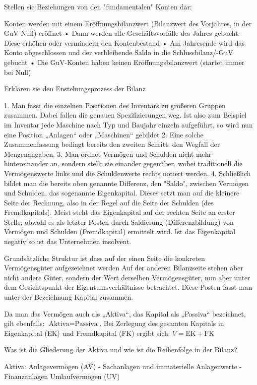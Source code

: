 Stellen sie Beziehungen von den "fundamentalen" Konten dar:

Konten werden mit einem
Eröffnungsbilanzwert
(Bilanzwert des Vorjahres, in der GuV
Null) eröffnet
• Dann werden alle Geschäftsvorfälle des
Jahres gebucht. Diese erhöhen oder
vermindern den Kontenbestand
• Am Jahresende wird das Konto
abgeschlossen und der verbleibende
Saldo in die Schlussbilanz/-GuV
gebucht
• Die GuV-Konten haben keinen
Eröffnungsbilanzwert
(startet immer bei Null)


Erklären sie den Enstehungsprozess der Bilanz

1. Man fasst die einzelnen Positionen des Inventars zu größeren Gruppen zusammen.
   Dabei fallen die genauen Spezifizierungen weg. Ist also zum Beispiel im Inventar
   jede Maschine nach Typ und Baujahr einzeln aufgeführt, so wird nun eine Position
   „Anlagen“ oder „Maschinen“ gebildet
2. Eine solche Zusammenfassung bedingt bereits den zweiten Schritt: den Wegfall der Mengenangaben.
3. Man ordnet Vermögen und Schulden nicht mehr hintereinander an, sondern
   stellt sie einander gegenüber, wobei traditionell die Vermögenswerte links und die
   Schuldenwerte rechts notiert werden.
4. Schließlich bildet man die bereits oben genannte Differenz, den "Saldo", zwischen
   Vermögen und Schulden, das sogenannte Eigenkapital. Dieses setzt man auf
   die kleinere Seite der Rechnung, also in der Regel auf die Seite der Schulden (des
   Fremdkapitals). Meist steht das Eigenkapital auf der rechten Seite an erster Stelle,
   obwohl es als letzter Posten durch Saldierung (Differenzbildung) von Vermögen
   und Schulden (Fremdkapital) ermittelt wird. Ist das Eigenkapital negativ so ist das Unternehmen insolvent.

Grundsätzliche Struktur ist dass auf der einen Seite die konkreten Vermögensgüter aufgezeichnet werden 
Auf der anderen Bilanzseite stehen aber nicht andere Güter, sondern der Wert derselben Vermögensgüter, nun aber unter dem Gesichtspunkt 
der Eigentumsverhältnisse betrachtet. Diese Posten fasst man unter der Bezeichnung Kapital zusammen.

Da man das Vermögen auch als „Aktiva“, das Kapital als „Passiva“ bezeichnet, gilt
ebenfalls:
\( \text{Aktiva} = \text{Passiva} \).
Bei Zerlegung des gesamten Kapitals in Eigenkapital (EK) und Fremdkapital (FK)
ergibt sich:
\( V = \text{EK} + \text{FK} \)

Was ist die Gliederung der Aktiva und wie ist die Reihenfolge in der Bilanz?

Aktiva:
Anlagevermögen (AV)
    - Sachanlagen und immaterielle Anlagenwerte
    -Finanzanlagen
Umlaufvermögen (UV)

